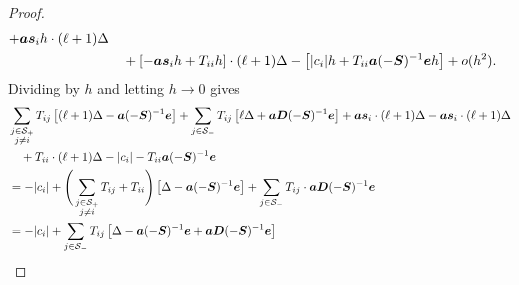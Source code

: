 \begin{proof}
\begin{align}
		+ \boldsymbol a \boldsymbol s_i h \cdot (\ell+1)\Delta  \nonumber
		\\&\quad {} + \left[-\boldsymbol a \boldsymbol s_ih  + T_{ii}h \right] \cdot (\ell+1)\Delta - \left[|c_i|  h  + T_{ii}\boldsymbol a(-\boldsymbol S)^{-1}\boldsymbol eh\right] + o(h^2). \label{eqnLc vwjb2}
	\end{align}
	Dividing by \(h\) and letting \(h\to 0\) gives 
	\begin{align}
		& \sum_{\substack{j\in\mathcal S_+\\j\neq i}}T_{ij} \left[ (\ell+1)\Delta - \boldsymbol a (-\boldsymbol S)^{-1}\boldsymbol e \right] \nonumber 
		+ \sum_{j\in\mathcal S_-}T_{ij} \left[ \ell\Delta + \boldsymbol a\boldsymbol D(-\boldsymbol S)^{-1}\boldsymbol e \right] \nonumber
		+ \boldsymbol a \boldsymbol s_i  \cdot (\ell+1)\Delta  \nonumber
		-\boldsymbol a \boldsymbol s_i \cdot (\ell+1)\Delta \\&\quad{} + T_{ii} \cdot (\ell+1)\Delta - |c_i|  - T_{ii}\boldsymbol a(-\boldsymbol S)^{-1}\boldsymbol e \nonumber 
		\\&= -|c_i| + \Bigg(\sum_{\substack{j\in\mathcal S_+\\j\neq i}}T_{ij}+T_{ii}\Bigg) \left[ \Delta - \boldsymbol a (-\boldsymbol S)^{-1}\boldsymbol e \right] \nonumber 
		+ \sum_{j\in\mathcal S_-}T_{ij} \cdot \boldsymbol a\boldsymbol D(-\boldsymbol S)^{-1}\boldsymbol e 
		\\&= -|c_i| + \sum_{j\in\mathcal S_-}T_{ij} \left[ \Delta - \boldsymbol a (-\boldsymbol S)^{-1}\boldsymbol e  +  \boldsymbol a\boldsymbol D(-\boldsymbol S)^{-1}\boldsymbol e \right] \nonumber 
	\end{align}
\end{proof}

